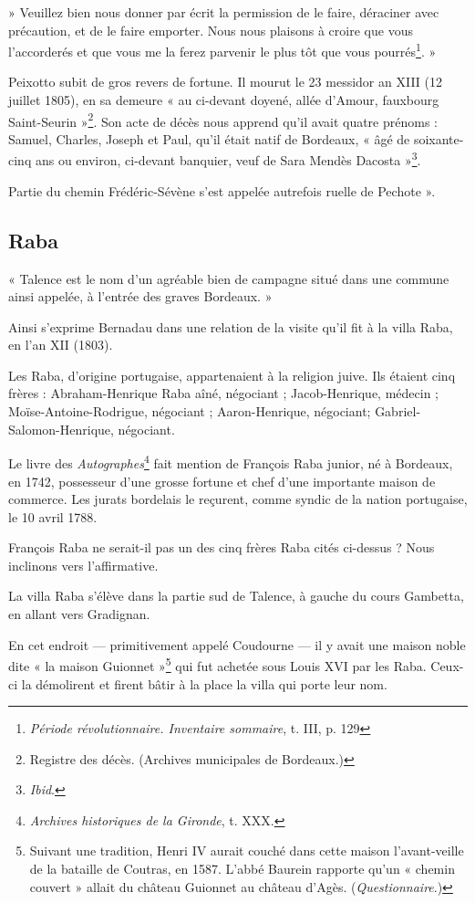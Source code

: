 » Veuillez bien nous donner par écrit la permission de le faire, déraciner avec précaution, et de le faire emporter. Nous nous plaisons à croire que vous l'accorderés et que vous me la ferez parvenir le plus tôt que vous pourrés\footnote{\textit{Période révolutionnaire. Inventaire sommaire}, t. III, p. 129}. »

Peixotto subit de gros revers de fortune. Il mourut le 23 messidor an XIII (12 juillet 1805), en sa demeure « au ci-devant doyené, allée d'Amour, fauxbourg Saint-Seurin »\footnote{Registre des décès. (Archives municipales de Bordeaux.)}. Son acte de décès nous apprend qu'il avait quatre prénoms : Samuel, Charles, Joseph et Paul, qu'il était natif de Bordeaux, « âgé de soixante-cinq ans ou environ, ci-devant banquier, veuf de Sara Mendès Dacosta »\footnote{\textit{Ibid}.}.

Partie du chemin Frédéric-Sévène s'est appelée autrefois ruelle de Pechote ».

\subsection{Raba}

« Talence est le nom d'un agréable bien de campagne situé dans une commune ainsi appelée, à l'entrée des graves Bordeaux. »

Ainsi s'exprime Bernadau dans une relation de la visite qu'il fit à la villa Raba, en l'an XII (1803).

Les Raba, d'origine portugaise, appartenaient à la religion juive. Ils étaient cinq frères : Abraham-Henrique Raba aîné, négociant ; Jacob-Henrique, médecin ; Moïse-Antoine-Rodrigue, négociant ; Aaron-Henrique, négociant; Gabriel-Salomon-Henrique, négociant.

Le livre des \textit{Autographes}\footnote{\textit{Archives historiques de la Gironde}, t. XXX.} fait mention de François Raba junior, né à Bordeaux, en 1742, possesseur d'une grosse fortune et chef d'une importante maison de commerce. Les jurats bordelais le reçurent, comme syndic de la nation portugaise, le 10 avril 1788.

François Raba ne serait-il pas un des cinq frères Raba cités ci-dessus ? Nous inclinons vers l'affirmative.

La villa Raba s'élève dans la partie sud de Talence, à gauche du cours Gambetta, en allant vers Gradignan.

En cet endroit — primitivement appelé Coudourne — il y avait une maison noble dite « la maison Guionnet »\footnote{Suivant une tradition, Henri IV aurait couché dans cette maison l'avant-veille de la bataille de Coutras, en 1587. L'abbé Baurein rapporte qu'un « chemin couvert » allait du château Guionnet au château d'Agès. (\textit{Questionnaire}.)} qui fut achetée sous Louis XVI par les Raba. Ceux-ci la démolirent et firent bâtir à la place la villa qui porte leur nom.


